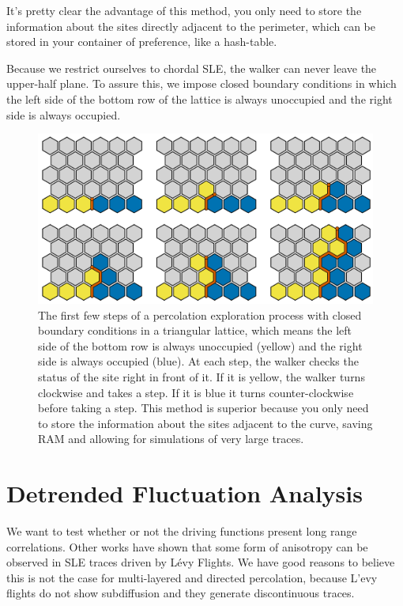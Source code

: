 It's pretty clear the advantage of this method, you only need to store the
information about the sites directly adjacent to the perimeter, which can be
stored in your container of preference, like a hash-table.

Because we restrict ourselves to chordal SLE, the walker can never leave the
upper-half plane. To assure this, we impose closed boundary conditions in which
the left side of the bottom row of the lattice is always unoccupied and the
right side is always occupied.

\begin{figure}
\begin{center}
    \includegraphics[scale=0.45]{chapters/ch6-asle/figs/explore}
\end{center}
\caption{The first few steps of a percolation exploration process with closed
    boundary conditions in a triangular lattice, which means the left side of
    the bottom row is always unoccupied (yellow) and the right side is always
    occupied (blue). At each step, the walker checks the status of the site
    right in front of it. If it is yellow, the walker turns clockwise and takes
    a step. If it is blue it turns counter-clockwise before taking a step. This
    method is superior because you only need to store the information about the
    sites adjacent to the curve, saving RAM and allowing for simulations of
    very large traces.}
\label{fig:explore}
\end{figure}


\section{Detrended Fluctuation Analysis}
\label{sec:dfa}

We want to test whether or not the driving functions present long range
correlations. Other works have shown that some form of anisotropy can be
observed in SLE traces driven by L\'evy Flights. We have good reasons to
believe this is not the case for multi-layered and directed percolation,
because L'evy flights do not show subdiffusion and they generate discontinuous
traces.

